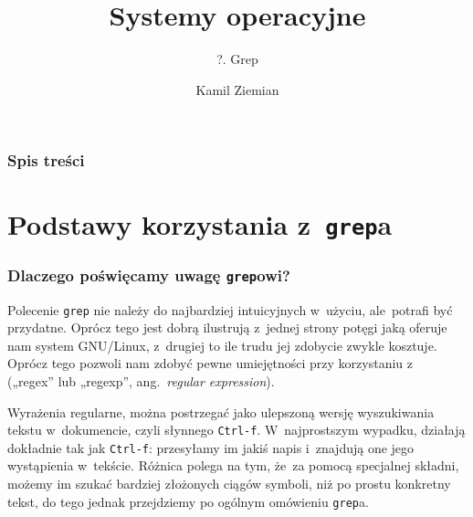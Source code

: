 \documentclass[10pt,t]{beamer}
\title{Systemy operacyjne}
\subtitle{?. Grep}
\author{Kamil Ziemian \\
  \email}
\begin{document}





\RaggedRight





\maketitle










\begin{frame}
  \frametitle{Spis treści}


  \tableofcontents

\end{frame}





\section{Podstawy korzystania z~\texttt{grep}a}


\begin{frame}
  \frametitle{Dlaczego poświęcamy uwagę \texttt{grep}owi?}


  Polecenie \texttt{grep} nie należy do najbardziej intuicyjnych w~użyciu,
  ale~potrafi być przydatne. Oprócz tego jest dobrą ilustrują z~jednej
  strony potęgi jaką oferuje nam system GNU/Linux, z~drugiej to ile
  trudu jej zdobycie zwykle kosztuje. Oprócz tego pozwoli nam zdobyć
  pewne umiejętności przy korzystaniu
  z~ („regex” lub „regexp”, ang.~\textit{regular expression}).

  Wyrażenia regularne, można postrzegać jako ulepszoną wersję wyszukiwania
  tekstu w~dokumencie, czyli słynnego \texttt{Ctrl-f}. W~najprostszym
  wypadku, działają dokładnie tak jak \texttt{Ctrl-f}: przesyłamy im
  jakiś napis i~znajdują one jego wystąpienia w~tekście. Różnica polega na
  tym, że~za pomocą specjalnej składni, możemy im szukać bardziej złożonych
  ciągów symboli, niż po prostu konkretny tekst, do tego jednak przejdziemy
  po ogólnym omówieniu \texttt{grep}a.

\end{frame}
\end{document}
